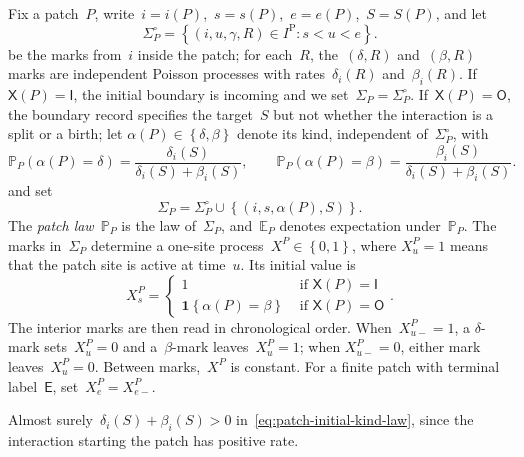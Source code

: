 \documentclass[EJP,preprint,NODS,nobera]{ejpecp}
\newcommand{\pP}{\mathbb{P}}
\newcommand{\E}{\mathbb{E}}
\newcommand{\bb}[1]{\left(#1\right)}
\newcommand{\cb}[1]{\left\{#1\right\}}
\newcommand{\ind}{\mathbf{1}}
\newcommand{\pw}[4]{\left\{\begin{array}{cl}
  #1 &\text{ if } #2 \\
  #3 &\text{ if } #4
\end{array}\right.}
\begin{document}
\begin{definition}
\label{def:patch-law}
Fix a patch~$P$, write~$i=i(P)$,~$s=s(P)$,~$e=e(P)$,~$S=S(P)$, and let
\begin{equation*}
\Sigma_P^\circ
=
\cb{(i,u,\gamma,R)\in I^{\mathrm P}:s<u<e}.
\end{equation*}
be the marks from~$i$ inside the patch; for each~$R$, the~$(\delta,R)$
and~$(\beta,R)$ marks are independent Poisson processes with
rates~$\delta_i(R)$ and~$\beta_i(R)$. If~$\mathsf X(P)=\mathsf I$, the initial
boundary is incoming and we set~$\Sigma_P=\Sigma_P^\circ$.
If~$\mathsf X(P)=\mathsf O$, the boundary record specifies the target~$S$ but
not whether the interaction is a split or a birth; let
$\alpha(P)\in\cb{\delta,\beta}$ denote its kind, independent
of~$\Sigma_P^\circ$, with
\begin{equation}
\label{eq:patch-initial-kind-law}
\pP_P\bb{\alpha(P)=\delta}
=
\frac{\delta_i(S)}{\delta_i(S)+\beta_i(S)},
\qquad
\pP_P\bb{\alpha(P)=\beta}
=
\frac{\beta_i(S)}{\delta_i(S)+\beta_i(S)}.
\end{equation}
and set
\begin{equation*}
\Sigma_P
=
\Sigma_P^\circ\cup\cb{(i,s,\alpha(P),S)}.
\end{equation*}
The \emph{patch law}~$\pP_P$ is the law of~$\Sigma_P$, and~$\E_P$ denotes
expectation under~$\pP_P$.
The marks in~$\Sigma_P$ determine a one-site process~$X^P\in\cb{0,1}$, where
$X_u^P=1$ means that the patch site is active at time~$u$. Its initial value is
\begin{equation*}
X_s^P
=
\pw{1}{\mathsf X(P)=\mathsf I}
{\ind\cb{\alpha(P)=\beta}}{\mathsf X(P)=\mathsf O}.
\end{equation*}
The interior marks are then read in chronological order. When~$X_{u-}^P=1$, a
$\delta$-mark sets~$X_u^P=0$ and a~$\beta$-mark leaves~$X_u^P=1$; when
$X_{u-}^P=0$, either mark leaves~$X_u^P=0$. Between marks,~$X^P$ is constant.
For a finite patch with terminal label~$\mathsf E$, set~$X_e^P=X_{e-}^P$.
\end{definition}

Almost surely~$\delta_i(S)+\beta_i(S)>0$ in~\eqref{eq:patch-initial-kind-law},
since the interaction starting the patch has positive rate.
\end{document}
